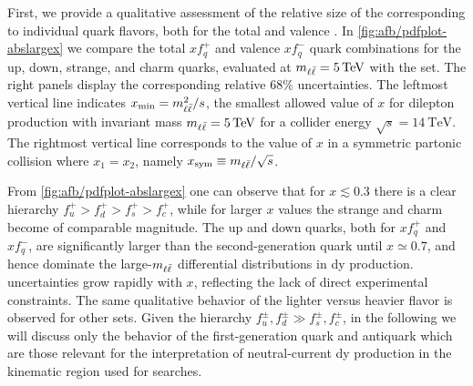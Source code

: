 First, we provide a qualitative assessment of the relative size of the \pdfs
corresponding to individual quark flavors, both for the total and valence
\pdfs.
In \cref{fig:afb/pdfplot-abslargex} we compare the total $xf^+_q$ and valence
$xf_q^-$ quark \pdf combinations for the up, down, strange, and charm quarks,
evaluated at $\mll=\SI{5}{\tera\electronvolt}$ with the  \nnlo \pdf
set.
%
The right panels display the corresponding relative 68\% \cl uncertainties.
%
The leftmost vertical line indicates $x_{\text{min}}=m_{\ell\bar{\ell}}^2/s$, the smallest
allowed value of $x$  for dilepton \dy production with invariant mass
$\mll=\SI{5}{\tera\electronvolt}$ for a collider \com energy
$\sqrt{s}=\SI{14}{\tera\electronvolt}$.
%
The rightmost vertical line corresponds to
the value of $x$ in a symmetric partonic collision where $x_1=x_2$, namely
$x_{\text{sym}}\equiv m_{\ell\bar{\ell}}/\sqrt{s}$.

   From \cref{fig:afb/pdfplot-abslargex} one can observe that for
   $x\lesssim 0.3$ there is a clear hierarchy
$f_u^+>f_d^+ >f_s^+>f_c^+$, while for larger $x$ values the
   strange and charm \pdfs become of comparable magnitude.
   The up and down quarks, both for $xf^+_q$ and $xf^-_q$, are significantly larger
   than the second-generation quark \pdfs until $x\simeq 0.7$, and hence dominate the
   large-$m_{\ell\bar{\ell}}$ differential distributions in \acrlong{dy} production.
%
\pdf uncertainties grow rapidly with $x$, reflecting the lack
of direct experimental constraints.
%
The same qualitative behavior of the lighter versus heavier flavor \pdfs
is observed for other \pdf sets.
%
Given the hierarchy $f_u^\pm, f_d^\pm \gg f_s^\pm, f_c^\pm $, in the following
we will discuss only the behavior of the first-generation quark
and antiquark \pdfs which are those relevant for the interpretation
of neutral-current \acrlong{dy} production in the kinematic region used
for \bsm searches. 
      


